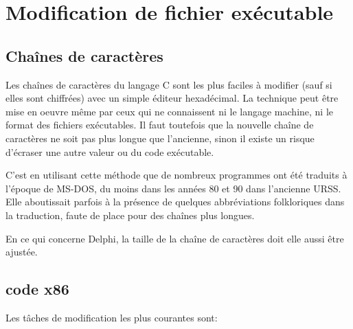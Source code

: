 ﻿\section{Modification de fichier exécutable}

\subsection{Chaînes de caractères}

Les chaînes de caractères du langage C sont les plus faciles à modifier (sauf si elles sont chiffrées)
avec un simple éditeur hexadécimal. La technique peut être mise en oeuvre même par ceux qui ne 
connaissent ni le langage machine, ni le format des fichiers exécutables.
Il faut toutefois que la nouvelle chaîne de caractères ne soit pas plus longue que l'ancienne, sinon 
il existe un risque d'écraser une autre valeur ou du code exécutable.


C'est en utilisant cette méthode que de nombreux programmes ont été traduits à l'époque de MS-DOS,
du moins dans les années 80 et 90 dans l'ancienne URSS. Elle aboutissait parfois à la présence de 
quelques abbréviations folkloriques dans la traduction, faute de place pour des chaînes plus longues.


En ce qui concerne Delphi, la taille de la chaîne de caractères doit elle aussi être ajustée.

\subsection{code x86}
\label{x86_patching}

Les tâches de modification les plus courantes sont:


